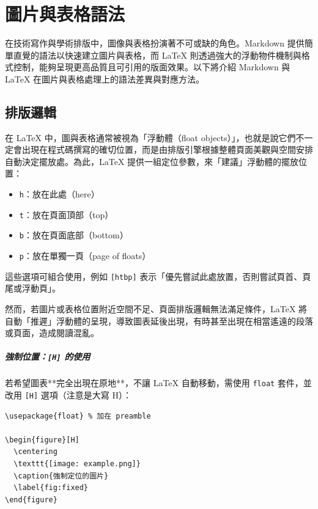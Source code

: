 \chapter{圖片與表格語法}
\label{chap3}

在技術寫作與學術排版中，圖像與表格扮演著不可或缺的角色。Markdown 提供簡單直覺的語法以快速建立圖片與表格，而 LaTeX 則透過強大的浮動物件機制與格式控制，能夠呈現更高品質且可引用的版面效果。以下將介紹 Markdown 與 LaTeX 在圖片與表格處理上的語法差異與對應方法。

\section{排版邏輯}

在 LaTeX 中，圖與表格通常被視為「浮動體（float objects）」，也就是說它們不一定會出現在程式碼撰寫的確切位置，而是由排版引擎根據整體頁面美觀與空間安排自動決定擺放處。為此，LaTeX 提供一組定位參數，來「建議」浮動體的擺放位置：

\begin{itemize}
  \item \texttt{h}：放在此處（here）
  \item \texttt{t}：放在頁面頂部（top）
  \item \texttt{b}：放在頁面底部（bottom）
  \item \texttt{p}：放在單獨一頁（page of floats）
\end{itemize}

這些選項可組合使用，例如 \texttt{[htbp]} 表示「優先嘗試此處放置，否則嘗試頁首、頁尾或浮動頁」。

然而，若圖片或表格位置附近空間不足、頁面排版邏輯無法滿足條件，LaTeX 將自動「推遲」浮動體的呈現，導致圖表延後出現，有時甚至出現在相當遙遠的段落或頁面，造成閱讀混亂。

\paragraph{強制位置：\texttt{[H]} 的使用}

若希望圖表**完全出現在原地**，不讓 LaTeX 自動移動，需使用 \texttt{float} 套件，並改用 \texttt{[H]} 選項（注意是大寫 H）：

\begin{verbatim}
\usepackage{float} % 加在 preamble

\begin{figure}[H]
  \centering
  \texttt{[image: example.png]}
  \caption{強制定位的圖片}
  \label{fig:fixed}
\end{figure}
\end{verbatim}

